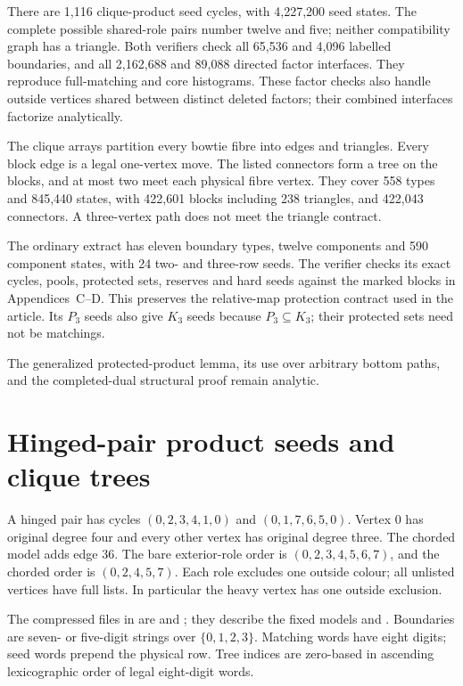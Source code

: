 There are 1,116 clique-product seed cycles, with 4,227,200 seed
states. The complete possible shared-role pairs number twelve and
five; neither compatibility graph has a triangle. Both verifiers
check all 65,536 and 4,096 labelled boundaries, and all 2,162,688
and 89,088 directed factor interfaces. They reproduce full-matching
and core histograms. These factor checks also handle
outside vertices shared between distinct deleted factors; their
combined interfaces factorize analytically.

The clique arrays partition every bowtie fibre into edges and
triangles. Every block edge is a legal one-vertex move. The listed
connectors form a tree on the blocks, and at most two meet each
physical fibre vertex. They cover 558 types and 845,440 states,
with 422,601 blocks including 238 triangles, and 422,043 connectors.
A three-vertex path does not meet the triangle contract.

The ordinary extract has eleven boundary types, twelve components
and 590 component states, with 24 two- and three-row seeds.
The verifier checks its exact cycles, pools, protected sets, reserves
and hard seeds against the marked blocks in Appendices~C--D.
This preserves the relative-map protection contract used in the
article. Its $P_3$ seeds also give $K_3$ seeds because
$P_3\subseteq K_3$; their protected sets need not be matchings.

The generalized protected-product lemma, its use over arbitrary
bottom paths, and the completed-dual structural proof remain analytic.

\clearpage
\section{Hinged-pair product seeds and clique trees}
\label{app:hinged-pair-certificates}
A hinged pair has cycles $(0,2,3,4,1,0)$ and $(0,1,7,6,5,0)$.
Vertex $0$ has original degree four and every other vertex has original
degree three. The chorded model adds edge $36$. The bare exterior-role
order is $(0,2,3,4,5,6,7)$, and the chorded order is $(0,2,4,5,7)$.
Each role excludes one outside colour; all unlisted vertices have full
lists. In particular the heavy vertex has one outside exclusion.

The compressed files in  are
 and ; they describe the fixed
models  and . Boundaries are
seven- or five-digit strings over $\{0,1,2,3\}$. Matching words have
eight digits; seed words prepend the physical row. Tree indices are
zero-based in ascending lexicographic order of legal eight-digit words.

